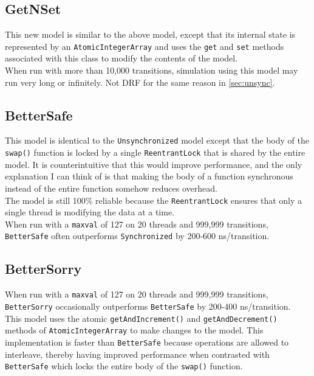 \documentclass[]{article}
\begin{document}
\subsection{GetNSet}
This  new model is similar to the above model, except that its internal state is represented by an \texttt{AtomicIntegerArray} and uses the \texttt{get} and \texttt{set} methods associated with this class to modify the contents of the model.\\

When run with more than 10,000 transitions, simulation using this model may run very long or infinitely. Not DRF for the same reason in \cref{sec:unsync}.
\subsection{BetterSafe}
This model is identical to the \texttt{Unsynchronized} model except that the body of the \texttt{swap()} function is locked by a single \texttt{ReentrantLock} that is shared by the entire model. It is counterintuitive that this would improve performance, and the only explanation I can think of is that making the body of a function synchronous instead of the entire function somehow reduces overhead.\\

The model is still 100\% reliable because the \texttt{ReentrantLock} ensures that only a single thread is modifying the data at a time.\\

When run with a \texttt{maxval} of 127 on 20 threads and 999,999 transitions, \texttt{BetterSafe} often outperforms \texttt{Synchronized} by 200-600 ns/transition.
\subsection{BetterSorry}
When run with a \texttt{maxval} of 127 on 20 threads and 999,999 transitions, \texttt{BetterSorry} occasionally outperforms \texttt{BetterSafe} by 200-400 ns/transition.\\

This model uses the atomic \texttt{getAndIncrement()} and \texttt{getAndDecrement()} methods of \texttt{AtomicIntegerArray} to make changes to the model. This implementation is faster than \texttt{BetterSafe} because operations are allowed to interleave, thereby having improved performance when contrasted with \texttt{BetterSafe} which locks the entire body of the \texttt{swap()} function.\\
\end{document}
